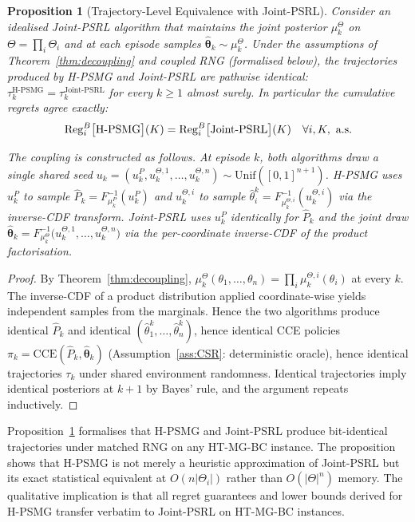 \documentclass{article}
\newtheorem{proposition}[theorem]{Proposition}
\begin{document}
\begin{proposition}[Trajectory-Level Equivalence with Joint-PSRL]
\label{prop:bit-identical}
Consider an idealised Joint-PSRL algorithm that maintains the joint posterior $\mu_k^\Theta$ on $\Theta = \prod_i \Theta_i$ and at each episode samples $\hat{\boldsymbol\theta}_k \sim \mu_k^\Theta$. Under the assumptions of Theorem~\ref{thm:decoupling} and \emph{coupled RNG} (formalised below), the trajectories produced by H-PSMG and Joint-PSRL are pathwise identical: $\tau_k^{\mathrm{H\text{-}PSMG}} = \tau_k^{\mathrm{Joint\text{-}PSRL}}$ for every $k \geq 1$ almost surely. In particular the cumulative regrets agree exactly:
\begin{equation}
\mathrm{Reg}_i^B\big[\textnormal{H-PSMG}\big](K) = \mathrm{Reg}_i^B\big[\textnormal{Joint-PSRL}\big](K) \quad \forall i, K, \text{ a.s.}
\end{equation}

The coupling is constructed as follows. At episode $k$, both algorithms draw a single shared seed $u_k = (u_k^P, u_k^{\Theta, 1}, \ldots, u_k^{\Theta, n}) \sim \mathrm{Unif}([0,1]^{n+1})$. H-PSMG uses $u_k^P$ to sample $\hat P_k = F_{\mu_k^P}^{-1}(u_k^P)$ and $u_k^{\Theta, i}$ to sample $\hat\theta_i^k = F_{\mu_k^{\Theta, i}}^{-1}(u_k^{\Theta, i})$ via the inverse-CDF transform. Joint-PSRL uses $u_k^P$ identically for $\hat P_k$ and the joint draw $\hat{\boldsymbol\theta}_k = F_{\mu_k^\Theta}^{-1}\big(u_k^{\Theta, 1}, \ldots, u_k^{\Theta, n}\big)$ via the per-coordinate inverse-CDF of the product factorisation.
\end{proposition}

\begin{proof}
By Theorem~\ref{thm:decoupling}, $\mu_k^\Theta(\theta_1, \ldots, \theta_n) = \prod_i \mu_k^{\Theta, i}(\theta_i)$ at every $k$. The inverse-CDF of a product distribution applied coordinate-wise yields independent samples from the marginals. Hence the two algorithms produce identical $\hat P_k$ and identical $(\hat\theta_1^k, \ldots, \hat\theta_n^k)$, hence identical CCE policies $\pi_k = \mathrm{CCE}(\hat P_k, \hat{\boldsymbol\theta}_k)$ (Assumption~\ref{ass:CSR}: deterministic oracle), hence identical trajectories $\tau_k$ under shared environment randomness. Identical trajectories imply identical posteriors at $k+1$ by Bayes' rule, and the argument repeats inductively.
\end{proof}

Proposition~\ref{prop:bit-identical} formalises that H-PSMG and Joint-PSRL produce bit-identical trajectories under matched RNG on any HT-MG-BC instance. The proposition shows that H-PSMG is not merely a heuristic approximation of Joint-PSRL but its exact statistical equivalent at $O(n|\Theta_i|)$ rather than $O(|\Theta|^n)$ memory. The qualitative implication is that all regret guarantees and lower bounds derived for H-PSMG transfer verbatim to Joint-PSRL on HT-MG-BC instances.
\end{document}
